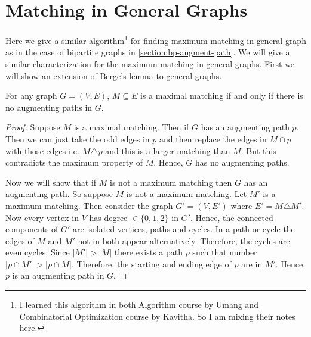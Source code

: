 \section{Matching in General Graphs}
Here we give a similar algorithm\footnote{I learned this algorithm in both Algorithm course by Umang and Combinatorial Optimization course by Kavitha. So I am mixing their notes here.} for finding maximum matching in general graph as in the case of bipartite graphs in \autoref{section:bp-augment-path}. We will give a similar characterization for the maximum matching in general graphs. First we will show an extension of Berge's lemma to general graphs.
\begin{Theorem}{}{}
	For any graph $G=(V,E)$, $M\subseteq E$ is a maximal matching if and only if there is no augmenting paths in $G$.
\end{Theorem}
\begin{proof}
	Suppose $M$ is a maximal matching. Then if $G$ has an augmenting path $p$. Then we can just take the odd edges in $p$ and then replace the edges in $M\cap p$ with those edges i.e. $M\triangle p$ and this is a larger matching than $M$. But this contradicts the maximum property of $M$. Hence, $G$ has no augmenting paths.

	Now we will show that if $M$ is not a maximum matching then $G$ has an augmenting path. So suppose $M$ is not a maximum matching. Let $M'$ is a maximum matching. Then consider the graph $G'=(V,E')$ where $E'=M\triangle M'$. Now every vertex in $V$ has degree $\in \{0,1,2\}$ in $G'$. Hence, the connected components of $G'$ are isolated vertices, paths and cycles. In a path or cycle the edges of $M$ and $M'$ not in both appear alternatively. Therefore, the cycles are even cycles. Since $|M'|>|M|$ there exists a path $p$ such that number $|p\cap M'|>|p\cap M|$. Therefore, the starting and ending edge of $p$ are in $M'$. Hence, $p$ is an augmenting path in $G$.
\end{proof}
